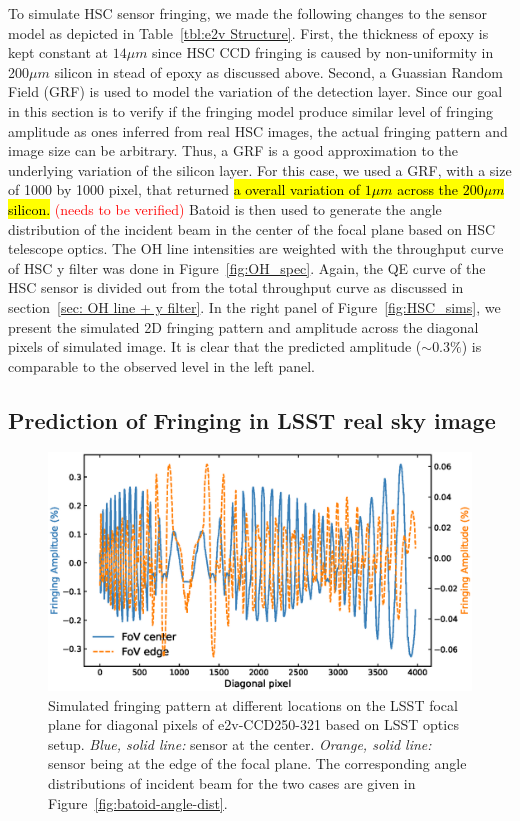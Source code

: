 \documentclass[twocolumn]{aastex63} %
\begin{document}
\begin{CJK*}{UTF8}{gbsn}
To simulate HSC sensor fringing, we made the following changes to the sensor model as depicted in Table~\ref{tbl:e2v Structure}. First, the thickness of epoxy is kept constant at $14\mu m$ since HSC CCD fringing is caused by non-uniformity in 200$\mu m$ silicon in stead of epoxy as discussed above. Second, a Guassian Random Field (GRF) is used to model the variation of the detection layer. Since our goal in this section is to verify if the fringing model produce similar level of fringing amplitude as ones inferred from real HSC images, the actual fringing pattern and image size can be arbitrary. Thus, a GRF is a good approximation to the underlying variation of the silicon layer. For this case, we used a GRF, with a size of 1000 by 1000 pixel, that returned \hl{ a overall variation of $1 \mu m$ across the $200\mu m$ silicon.} \textcolor{red}{(needs to be verified)} Batoid is then used to generate the angle distribution of the incident beam in the center of the focal plane based on HSC telescope optics. The OH line intensities are weighted with the throughput curve of HSC y filter was done in Figure~\ref{fig:OH_spec}. Again, the QE curve of the HSC sensor is divided out from the total throughput curve as discussed in section~\ref{sec: OH line + y filter}. In the right panel of Figure~\ref{fig:HSC_sims}, we present the simulated 2D fringing pattern and amplitude across the diagonal pixels of simulated image. It is clear that the predicted  amplitude ($\sim 0.3\%$) is comparable to the observed level in the left panel.

\subsection{Prediction of Fringing in LSST real sky image}
\begin{figure}[htb]
\centering
\includegraphics[scale = 0.41]{LSST-fringe-sims.eps}
\caption{Simulated fringing pattern at different locations on the LSST focal plane for diagonal pixels of e2v-CCD250-321 based on LSST optics setup. {\it Blue, solid line:} sensor at the center. {\it Orange, solid line:} sensor being at the edge of the focal plane. The corresponding angle distributions of incident beam for the two cases are given in Figure~\ref{fig:batoid-angle-dist}.}
\label{fig:LSST_sims}
\end{figure}


\end{CJK*}
\end{document}
